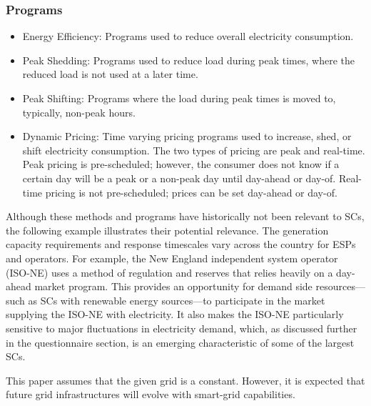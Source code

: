 \subsubsection{Programs}
\begin{itemize}
\item Energy Efficiency:  Programs used to reduce overall electricity consumption.

\item Peak Shedding:  Programs used to reduce load during peak times, 
where the reduced load is not used at a later time. 

\item Peak Shifting:  Programs where the load during peak times is moved to, typically, non-peak hours. 

\item Dynamic Pricing:  Time varying pricing programs used to increase, shed,
 or shift electricity consumption. 
The two types of pricing are peak and real-time.  Peak pricing is pre-scheduled; however, the consumer 
does not know if a certain day will be a peak or a non-peak day until day-ahead or day-of.  
Real-time pricing is not pre-scheduled; prices can be set day-ahead or day-of.
\end{itemize}

Although these methods and programs have historically not been relevant to SCs,
the following example illustrates their potential relevance.
The generation capacity requirements and response timescales vary across the country for ESPs and operators. For example, the New England independent system operator (ISO-NE) uses a method 
of regulation and reserves that relies heavily on a day-ahead market program. This provides an opportunity 
for demand side resources---such as SCs with renewable energy sources---to participate in the 
market supplying the ISO-NE with electricity. It also makes the ISO-NE particularly sensitive to major 
fluctuations in electricity demand, which, as discussed further in the questionnaire section, is an emerging 
characteristic of some of the largest SCs.%

This paper assumes that the given grid is a constant. However, it is expected 
that future grid infrastructures will 
evolve with smart-grid capabilities. 